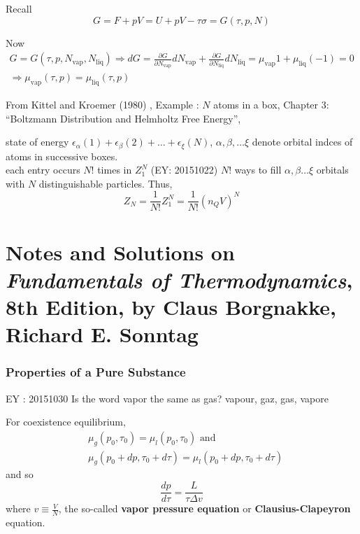 \documentclass[10pt]{amsart}
\begin{document}
\begin{multicols*}{2}
Recall 
\[
G = F + pV = U + pV - \tau \sigma =G(\tau,p,N)
\]

Now 
\[
\begin{gathered}
  G = G(\tau, p, N_{\text{vap}}, N_{\text{liq}} )
\Longrightarrow dG = \frac{ \partial G}{ \partial N_{\text{vap}}} dN_{\text{vap}} + \frac{ \partial G}{ \partial N_{\text{liq}} } dN_{\text{liq}} = \mu_{\text{vap}} 1 + \mu_{\text{liq}} (-1) = 0  \\
\Longrightarrow \mu_{\text{vap}}(\tau,p) = \mu_{\text{liq}}(\tau,p)
\end{gathered}
\]

From Kittel and Kroemer (1980) \cite{CKittelHKroemer1980}, Example : $N$ atoms in a box, Chapter 3: ``Boltzmann Distribution and Helmholtz Free Energy'', 

state of energy $\epsilon_{\alpha}(1) + \epsilon_{\beta}(2) + \dots + \epsilon_{\xi}(N)$, $\alpha, \beta, \dots \xi$ denote orbital indces of atoms in successive boxes.  \\
each entry occurs $N!$ times in $Z_1^N$ (EY: 20151022) $N!$ ways to fill $\alpha, \beta \dots \xi$ orbitals with $N$ distinguishable particles.  Thus,
\[
Z_N = \frac{1}{N!} Z_1^N = \frac{1}{N!} (n_Q V)^N
\]


\part{Notes and Solutions on \emph{Fundamentals of Thermodynamics}, 8th Edition, by Claus Borgnakke, Richard E. Sonntag}
\cite{CBorgnakkeRSonntag2012}

\section{}

\section{Properties of a Pure Substance}

EY : 20151030 Is the word vapor the same as gas?  vapour, gaz, gas, vapore

For coexistence equilibrium, 
\[
\begin{aligned}
  & \mu_g(p_0,\tau_0) = \mu_l(p_0,\tau_0) \text{ and } \\ 
  & \mu_g(p_0 + dp, \tau_0+d\tau) = \mu_l(p_0 + dp, \tau_0+d\tau)
\end{aligned}
\]
and so 
\begin{equation}
  \frac{dp}{d\tau} = \frac{L}{\tau \Delta v}
\end{equation}
where $v\equiv \frac{V}{N}$, the so-called \textbf{vapor pressure equation} or \textbf{Clausius-Clapeyron} equation.  


\end{multicols*}
\end{document}

